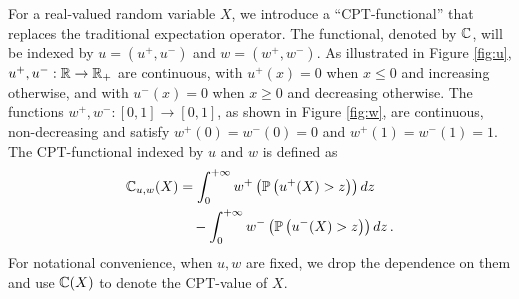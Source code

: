 
For a real-valued random variable $X$, we introduce a ``CPT-functional'' that replaces the traditional expectation operator. 
The functional, denoted by $\mathbb{C}$, will be 
indexed by
$u=(u^+,u^-)$ and $w=(w^+,w^-)$. 
As illustrated in Figure \ref{fig:u}, $u^+,u^-:\mathbb{R}\rightarrow \mathbb{R}_+$ are continuous,
with $u^+(x)=0$ when $x\le 0$ and increasing otherwise, and with $u^-(x)=0$ when $x\ge 0$ and decreasing otherwise.
The functions $w^+,w^-:[0,1] \rightarrow [0,1]$, as shown in Figure \ref{fig:w}, are continuous, non-decreasing and  satisfy $w^+(0)=w^-(0)=0$ and $w^+(1)=w^-(1)=1$.
The CPT-functional indexed by $u$ and $w$ is defined as 
\begin{align}
\mathbb{C}_{u,w}(X) &= \int_0^{+\infty} w^+\left(\mathbb{P}\left( u^+(X)>z \right)\right) dz\nonumber \\
&\quad - \int_0^{+\infty} w^-\left(\mathbb{P}\left( u^-(X)>z \right)\right) dz\,. \label{eq:cpt-general}
\end{align}
For notational convenience, when $u,w$ are fixed, we drop the dependence on them and use $\mathbb{C}(X)$ to denote the CPT-value of $X$. 

